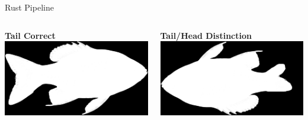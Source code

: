 \begin{frame}{Rust Pipeline}
    \begin{columns}[c]
          \centering
          \textbf{Tail Correct}\\[1ex]
          \includegraphics[height=0.48\textheight,keepaspectratio]{./images/picture1.png}
    
          \centering
          \textbf{Tail/Head Distinction}\\[1ex]
          \includegraphics[height=0.48\textheight,keepaspectratio]{./images/picture2.png}
    \end{columns}
\end{frame}

